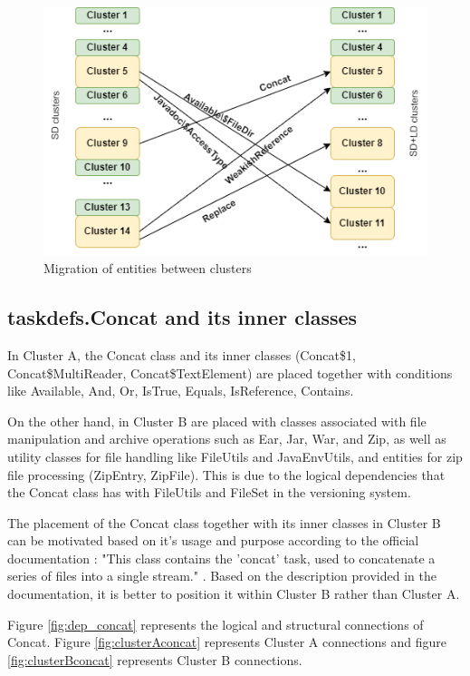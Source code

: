 \documentclass[conference]{IEEEtran}
\begin{document}
\begin{figure}
\centering
\includegraphics[width=\columnwidth]{clusters.png}
\caption{Migration of entities between clusters}
\label{fig:clustersmigration}
\centering
\end{figure}

\subsection{taskdefs.Concat and its inner classes}
In Cluster A, the Concat class and its inner classes (Concat\$1, Concat\$MultiReader, Concat\$TextElement) are placed together with conditions like Available, And, Or, IsTrue, Equals, IsReference, Contains.

On the other hand, in Cluster B are placed with classes associated with file manipulation and archive operations such as Ear, Jar, War, and Zip, as well as utility classes for file handling like FileUtils and JavaEnvUtils, and entities for zip file processing (ZipEntry, ZipFile).  This is due to the logical dependencies that the Concat class has with FileUtils and FileSet in the versioning system.


The placement of the Concat class together with its inner classes in Cluster B can be motivated based on it's usage and purpose according to the official documentation : "This class contains the 'concat' task, used to concatenate a series of files into a single stream." \cite{ant_concat}. 
Based on the description provided in the documentation, it is better to position it within Cluster B rather than Cluster A.

Figure \ref{fig:dep_concat} represents the logical and structural connections of Concat. Figure \ref{fig:clusterAconcat} represents Cluster A connections and figure \ref{fig:clusterBconcat} represents Cluster B connections.
\end{document}
